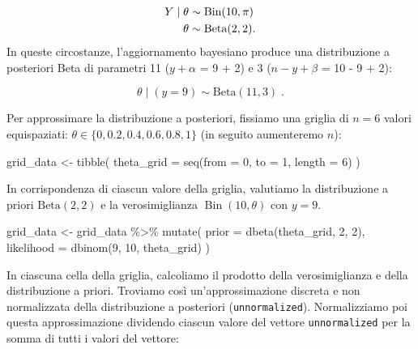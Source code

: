\documentclass[
]{memoir}
\newenvironment{Shaded}{\begin{snugshade}}{\end{snugshade}}
\newcommand{\AttributeTok}[1]{\textcolor[rgb]{0.77,0.63,0.00}{#1}}
\newcommand{\DecValTok}[1]{\textcolor[rgb]{0.00,0.00,0.81}{#1}}
\newcommand{\FunctionTok}[1]{\textcolor[rgb]{0.00,0.00,0.00}{#1}}
\newcommand{\NormalTok}[1]{#1}
\newcommand{\OtherTok}[1]{\textcolor[rgb]{0.56,0.35,0.01}{#1}}
\newcommand{\SpecialCharTok}[1]{\textcolor[rgb]{0.00,0.00,0.00}{#1}}
\DeclareMathOperator{\Bin}{Bin} %
\begin{document}
\begin{align}
Y \mid \theta & \sim \text{Bin}(10, \pi) \notag\\
\theta & \sim \mbox{Beta}(2, 2).
\end{align}
In queste circostanze, l'aggiornamento bayesiano produce una distribuzione a posteriori Beta di parametri 11 (\(y + \alpha\) = 9 + 2) e 3 (\(n - y + \beta\) = 10 - 9 + 2):

\begin{equation}
\theta \mid (y = 9) \sim \mbox{Beta}(11, 3) \; .
\end{equation}

Per approssimare la distribuzione a posteriori, fissiamo una griglia di \(n = 6\) valori equispaziati: \(\theta \in \{0, 0.2, 0.4, 0.6, 0.8, 1\}\) (in seguito aumenteremo \(n\)):

\begin{Shaded}
\begin{Highlighting}[]
\NormalTok{grid\_data }\OtherTok{\textless{}{-}} \FunctionTok{tibble}\NormalTok{(}
  \AttributeTok{theta\_grid =} \FunctionTok{seq}\NormalTok{(}\AttributeTok{from =} \DecValTok{0}\NormalTok{, }\AttributeTok{to =} \DecValTok{1}\NormalTok{, }\AttributeTok{length =} \DecValTok{6}\NormalTok{)}
\NormalTok{)}
\end{Highlighting}
\end{Shaded}

\noindent
In corrispondenza di ciascun valore della griglia, valutiamo la distribuzione a priori \(\mbox{Beta}(2, 2)\) e la verosimiglianza \(\Bin(10, \theta)\) con \(y = 9\).

\begin{Shaded}
\begin{Highlighting}[]
\NormalTok{grid\_data }\OtherTok{\textless{}{-}}\NormalTok{ grid\_data }\SpecialCharTok{\%\textgreater{}\%}
  \FunctionTok{mutate}\NormalTok{(}
    \AttributeTok{prior =} \FunctionTok{dbeta}\NormalTok{(theta\_grid, }\DecValTok{2}\NormalTok{, }\DecValTok{2}\NormalTok{),}
    \AttributeTok{likelihood =} \FunctionTok{dbinom}\NormalTok{(}\DecValTok{9}\NormalTok{, }\DecValTok{10}\NormalTok{, theta\_grid)}
\NormalTok{  )}
\end{Highlighting}
\end{Shaded}

\noindent
In ciascuna cella della griglia, calcoliamo il prodotto della verosimiglianza e della distribuzione a priori. Troviamo così un'approssimazione discreta e non normalizzata della distribuzione a posteriori (\texttt{unnormalized}). Normalizziamo poi questa approssimazione dividendo ciascun valore del vettore \texttt{unnormalized} per la somma di tutti i valori del vettore:
\end{document}

